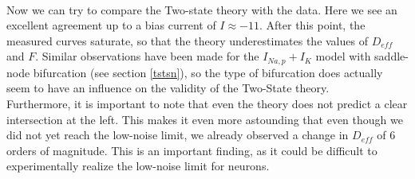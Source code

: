 \documentclass[12pt,a4paper]{article}
\begin{document}
\\
Now we can try to compare the Two-state theory with the data. Here we see an excellent agreement up to a bias current of $I\approx-11$. After this point, the measured curves saturate, so that the theory underestimates the values of $D_{eff}$ and $F$. Similar observations have been made for the $I_{Na,p}+I_K$ model with saddle-node bifurcation (see section \ref{tstsn}), so the type of bifurcation does actually seem to have an influence on the validity of the Two-State theory.\\
Furthermore, it is important to note that even the theory does not predict a clear intersection at the left. This makes it even more astounding that even though we did not yet reach the low-noise limit, we already observed a change in $D_{eff}$ of 6 orders of magnitude. This is an important finding, as it could be difficult to experimentally realize the low-noise limit for neurons.
\end{document}
